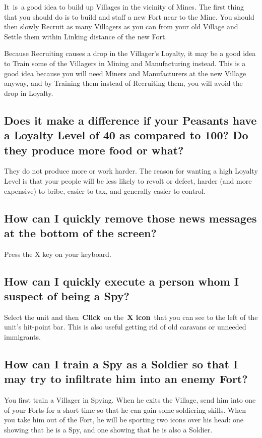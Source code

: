 It is a good idea to build up Villages in the vicinity of Mines. The first thing that you should do is to build and staff a new Fort near to the Mine. You should then slowly Recruit as many Villagers as you can from your old Village and Settle them within Linking distance of the new Fort.

Because Recruiting causes a drop in the Villager’s Loyalty, it may be a good idea to Train some of the Villagers in Mining and Manufacturing instead. This is a good idea because you will need Miners and Manufacturers at the new Village anyway, and by Training them instead of Recruiting them, you will avoid the drop in Loyalty.

\subsection{Does it make a difference if your Peasants have a Loyalty Level of 40 as compared to 100? Do they produce more food or what?}

They do not produce more or work harder. The reason for wanting a high Loyalty Level is that your people will be less likely to revolt or defect, harder (and more expensive) to bribe, easier to tax, and generally easier to control.

\subsection{How can I quickly remove those news messages at the bottom of the screen?}

Press the X key on your keyboard.

\subsection{How can I quickly execute a person whom I suspect of being a Spy?}

Select the unit and then \textbf{Click} on the \textbf{X icon} that you can see to the left of the unit’s hit-point bar. This is also useful getting rid of old caravans or unneeded immigrants.

\subsection{How can I train a Spy as a Soldier so that I may try to infiltrate him into an enemy Fort?}

You first train a Villager in Spying. When he exits the Village, send him into one of your Forts for a short time so that he can gain some soldiering skills. When you take him out of the Fort, he will be sporting two icons over his head: one showing that he is a Spy, and one showing that he is also a Soldier.